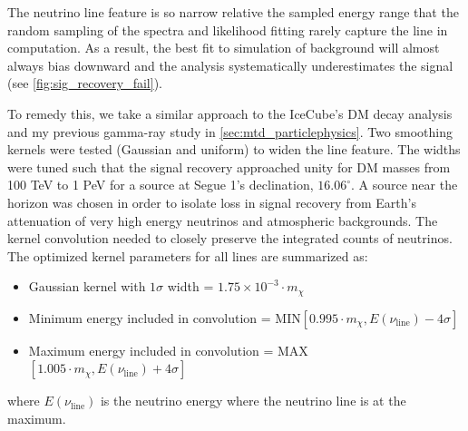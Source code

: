 The neutrino line feature is so narrow relative the sampled energy range that the random sampling of the spectra and likelihood fitting rarely capture the line in computation.
As a result, the best fit to simulation of background will  almost always bias downward and the analysis systematically underestimates the signal (see \cref{fig:sig_recovery_fail}).

To remedy this, we take a similar approach to the IceCube's DM decay analysis \cite{Minjin_icrc23} and my previous gamma-ray study in \cref{sec:mtd_particlephysics}.
Two smoothing kernels were tested (Gaussian and uniform) to widen the line feature.
The widths were tuned such that the signal recovery approached unity for DM masses from 100 TeV to 1 PeV for a source at Segue 1's declination, $16.06^\circ$.
A source near the horizon was chosen in order to isolate loss in signal recovery from Earth's attenuation of very high energy neutrinos and atmospheric backgrounds.
The kernel convolution needed to closely preserve the integrated counts of neutrinos.
The optimized kernel parameters for all lines are summarized as:
\begin{itemize}
    \item Gaussian kernel with $1 \sigma$ width = $1.75 \times 10^{-3} \cdot m_\chi$
    \item Minimum energy included in convolution = MIN$[0.995 \cdot m_\chi, E(\nu_\mathrm{line}) -4\sigma]$
    \item Maximum energy included in convolution = MAX$[1.005 \cdot m_\chi, E(\nu_\mathrm{line}) +4\sigma]$
\end{itemize}
where $E(\nu_{\mathrm{line}})$ is the neutrino energy where the neutrino line is at the maximum.

